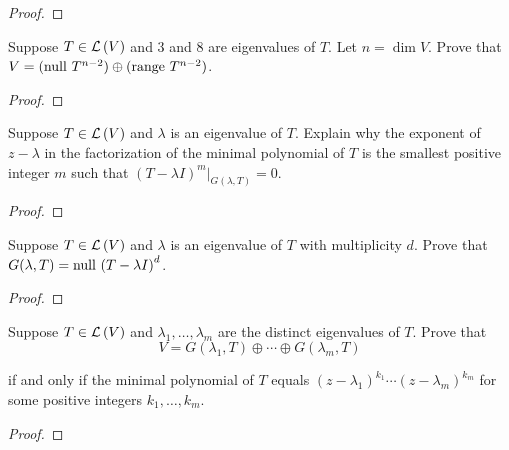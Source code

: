 \begin{proof}
\end{proof}
\newpage

\begin{exercise}\label{chapter8:sectionB:exercise5}
    Suppose $T\in\mathcal{L}\left({V}\right)$ and $3$ and $8$ are eigenvalues of $T$. Let $n = \dim V$. Prove that $V = {(\operatorname{null}\,{T^{n-2}})}\oplus {(\operatorname{range}\,{T^{n-2}})}$.
\end{exercise}

\begin{proof}
\end{proof}
\newpage

\begin{exercise}\label{chapter8:sectionB:exercise6}
    Suppose $T \in \mathcal{L}\left({V}\right)$ and $\lambda$ is an eigenvalue of $T$. Explain why the exponent of $z - \lambda$ in the factorization of the minimal polynomial of $T$ is the smallest positive integer $m$ such that ${(T - \lambda I)}^{m}\vert_{G( \lambda, T)} = 0$.
\end{exercise}

\begin{proof}
\end{proof}
\newpage

\begin{exercise}\label{chapter8:sectionB:exercise7}
    Suppose $T \in \mathcal{L}\left({V}\right)$ and $\lambda$ is an eigenvalue of $T$ with multiplicity $d$. Prove that $G(\lambda, T) = \operatorname{null}\,{{(T - \lambda I)}^{d}}$.
\end{exercise}

\begin{proof}
\end{proof}
\newpage

\begin{exercise}\label{chapter8:sectionB:exercise8}
    Suppose $T\in\mathcal{L}\left({V}\right)$ and $\lambda_{1}, \ldots, \lambda_{m}$ are the distinct eigenvalues of $T$. Prove that
    \[
        V = G(\lambda_{1}, T)\oplus \cdots \oplus G(\lambda_{m}, T)
    \]

    if and only if the minimal polynomial of $T$ equals ${(z - \lambda_{1})}^{k_{1}}\cdots {(z - \lambda_{m})}^{k_{m}}$ for some positive integers $k_{1}, \ldots, k_{m}$.
\end{exercise}

\begin{proof}
\end{proof}
\newpage

